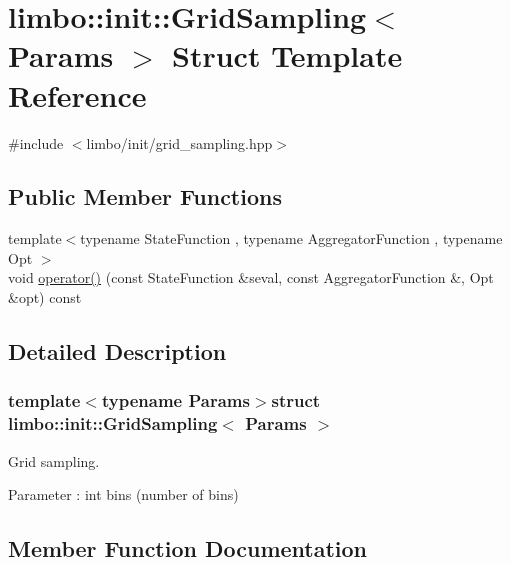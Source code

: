 \hypertarget{structlimbo_1_1init_1_1_grid_sampling}{}\section{limbo\+:\+:init\+:\+:Grid\+Sampling$<$ Params $>$ Struct Template Reference}
\label{structlimbo_1_1init_1_1_grid_sampling}


{\ttfamily \#include $<$limbo/init/grid\+\_\+sampling.\+hpp$>$}

\subsection*{Public Member Functions}
\begin{DoxyCompactItemize}
\item 
{\footnotesize template$<$typename State\+Function , typename Aggregator\+Function , typename Opt $>$ }\\void \hyperlink{structlimbo_1_1init_1_1_grid_sampling_a9b17fba72e1ae09a3361e9dcb8ff3fe3}{operator()} (const State\+Function \&seval, const Aggregator\+Function \&, Opt \&opt) const 
\end{DoxyCompactItemize}


\subsection{Detailed Description}
\subsubsection*{template$<$typename Params$>$struct limbo\+::init\+::\+Grid\+Sampling$<$ Params $>$}

Grid sampling.

Parameter \+: {\ttfamily int bins} (number of bins) 

\subsection{Member Function Documentation}
\hypertarget{structlimbo_1_1init_1_1_grid_sampling_a9b17fba72e1ae09a3361e9dcb8ff3fe3}{}
